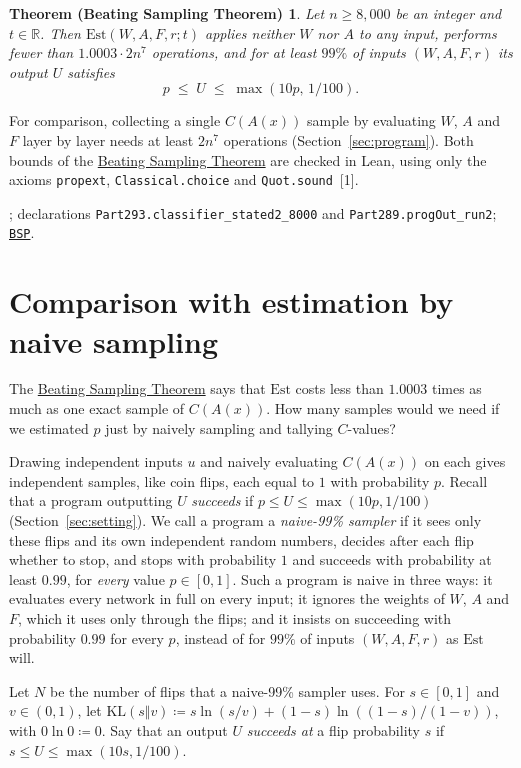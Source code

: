 \documentclass[10pt]{article}
\newcommand{\leanver}{v1.1}
\newcommand{\leanblob}{https://github.com/andrewcritch/beating-sampling-theorem/blob/\leanver/lean}
\newcommand{\leanmark}[1]{{\relscale{0.78}\color{gray}[#1]}}
\newenvironment{leanitems}{\par\smallskip\relscale{0.78}\color{gray}\hypersetup{urlcolor=gray}\raggedright%
  \begin{list}{}{\setlength{\leftmargin}{2em}\setlength{\labelwidth}{1.6em}%
  \setlength{\labelsep}{0.4em}\setlength{\itemsep}{0pt}\setlength{\topsep}{0pt}%
  \setlength{\parsep}{0pt}}}{\end{list}\par\medskip}
\newtheorem*{bstheorem}{Theorem (Beating Sampling Theorem)}
\newcommand{\bst}{\hyperref[thm:main]{Beating Sampling Theorem}}
\newcommand{\RR}{\mathbb{R}}
\newcommand{\Est}{\mathrm{Est}}
\begin{document}
\label{thm:main}
\begin{bstheorem}
Let $n\ge 8{,}000$ be an integer and $t\in\RR$. Then $\Est(W,A,F,r;t)$ applies
neither $W$ nor $A$ to any input, performs
fewer than $1.0003\cdot 2n^7$ operations, and for at least $99\%$ of inputs
$(W,A,F,r)$ its output $U$ satisfies
\[
  p\;\le\;U\;\le\;\max(10p,\,1/100).
\]
\end{bstheorem}

For comparison, collecting a single $C(A(x))$ sample by evaluating $W$, $A$ and $F$ layer by layer needs at least $2n^7$
operations (Section~\ref{sec:program}). Both bounds of the \bst{} are checked in Lean, using only the axioms
\texttt{propext}, \texttt{Classical.choice} and \texttt{Quot.sound}~\leanmark{1}.
\begin{leanitems}
; declarations \texttt{Part293.classifier\_stated2\_8000} and \texttt{Part289.progOut\_run2}; \href{\leanblob/BSP.lean}{\nolinkurl{BSP}}.
\end{leanitems}

\section{Comparison with estimation by naive sampling}\label{sec:comparison}

The \bst{} says that $\Est$ costs less than $1.0003$ times as much as one
exact sample of $C(A(x))$. How many samples would we need if we estimated 
$p$ just by naively sampling and tallying $C$-values?

Drawing independent inputs $u$ and naively evaluating $C(A(x))$ on each gives independent samples, like coin flips, each equal to
$1$ with probability $p$. Recall that a program outputting $U$
\emph{succeeds} if $p\le U\le\max(10p,1/100)$ (Section~\ref{sec:setting}). We call a program a \emph{naive-99\% sampler} if it sees only these flips and
its own independent random numbers, decides after each flip whether to stop,
and stops with probability $1$ and succeeds with probability at least $0.99$,
for \emph{every} value $p\in[0,1]$. Such a program is naive in three ways: it
evaluates every network in full on every input; it ignores the
weights of $W$, $A$ and $F$, which it uses only through the flips; and it
insists on succeeding with probability $0.99$ for every $p$, instead
of for $99\%$ of inputs $(W,A,F,r)$ as $\Est$ will.

Let $N$ be the number of flips that a naive-99\% sampler uses. For
$s\in[0,1]$ and $v\in(0,1)$, let
$\mathrm{KL}(s\Vert v)\coloneqq s\ln(s/v)+(1-s)\ln((1-s)/(1-v))$, with
$0\ln0\coloneqq0$. Say that an output $U$ \emph{succeeds at} a flip
probability $s$ if $s\le U\le\max(10s,1/100)$.
\end{document}
